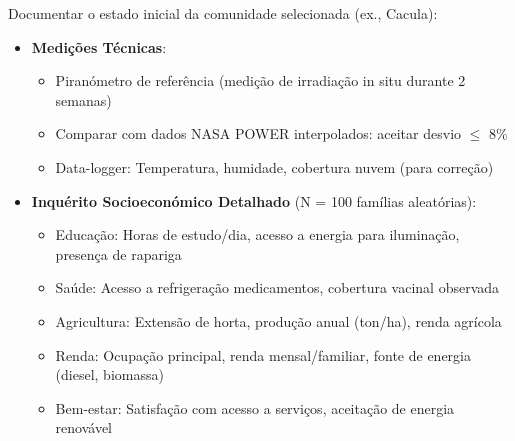 \documentclass[12pt, a4paper]{article}
\begin{document}
\begin{itemize}
Documentar o estado inicial da comunidade selecionada (ex., Cacula):

\begin{itemize}
\item \textbf{Medições Técnicas}:
  \begin{itemize}
  \item Piranómetro de referência (medição de irradiação in situ durante 2 semanas)
  \item Comparar com dados NASA POWER interpolados: aceitar desvio \(\leq\) 8\%
  \item Data-logger: Temperatura, humidade, cobertura nuvem (para correção)
  \end{itemize}

\item \textbf{Inquérito Socioeconómico Detalhado} (N = 100 famílias aleatórias):
  \begin{itemize}
  \item Educação: Horas de estudo/dia, acesso a energia para iluminação, presença de rapariga
  \item Saúde: Acesso a refrigeração medicamentos, cobertura vacinal observada
  \item Agricultura: Extensão de horta, produção anual (ton/ha), renda agrícola
  \item Renda: Ocupação principal, renda mensal/familiar, fonte de energia (diesel, biomassa)
  \item Bem-estar: Satisfação com acesso a serviços, aceitação de energia renovável
  \end{itemize}


\end{itemize}
\end{itemize}
\end{document}
